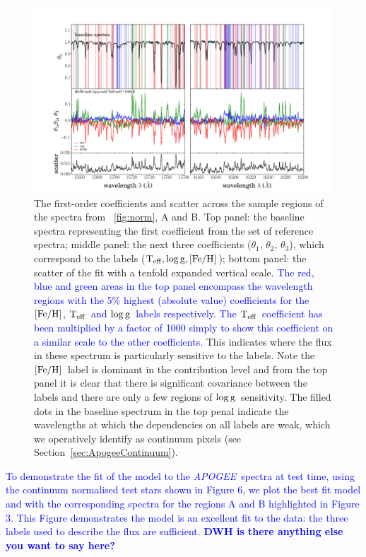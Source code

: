 \documentclass[12pt, preprint]{aastex}
\newcommand{\sectionname}{Section}
\newcommand{\apogee}{\textsl{APOGEE}}
\newcommand{\teff}{\mbox{$\rm T_{eff}$}}
\newcommand{\feh}{\mbox{$\rm [Fe/H]$}}
\newcommand{\logg}{\mbox{$\rm \log g$}}
\begin{document}
\begin{figure}[h!]
\centering
    \includegraphics[width=\hsize]{./plots/aftersubmit/fig5.png}
  \caption{The first-order coefficients and scatter across the sample regions of the spectra from \figurename~\ref{fig:norm}, A and B. Top panel: the baseline spectra representing the first coefficient from the set of reference spectra; middle panel: the next three coefficients ($\theta_1$, $\theta_2$, $\theta_3$),  which correspond to the labels ($\teff, \logg, \feh$); bottom panel: the scatter of the fit with a tenfold expanded vertical scale.  \textcolor{blue}{The red, blue and green areas in the top panel encompass the wavelength regions with the 5\% highest (absolute value) coefficients for the \feh, \teff\ and \logg\ labels respectively}. \textcolor{blue}{The \teff\ coefficient has been multiplied by a factor of 1000 simply to show this coefficient on a similar scale to the other coefficients.} This indicates where the flux in these spectrum is particularly sensitive to the labels.  Note the \feh\ label is dominant in the contribution level and from the top panel it is clear that there is significant covariance between the labels and there are only a few regions of \logg\ sensitivity. The filled dots in the baseline spectrum in the top penal indicate the wavelengths at which the dependencies on all labels are weak, which we operatively identify as continuum pixels (see \sectionname~\ref{sec:ApogeeContinuum}).}
\label{fig:coeffs}
\end{figure}

\textcolor{blue}{To demonstrate the fit of the model to the \apogee\ spectra at test time, using the continuum normalised test stars shown in Figure 6, we plot the best fit model and with the corresponding spectra for the regions A and B highlighted in Figure 3. This Figure demonstrates the model is an excellent fit to the data: the three labels used to  describe the flux  are sufficient. \textbf{DWH is there anything else you want to say here?} }
\end{document}
